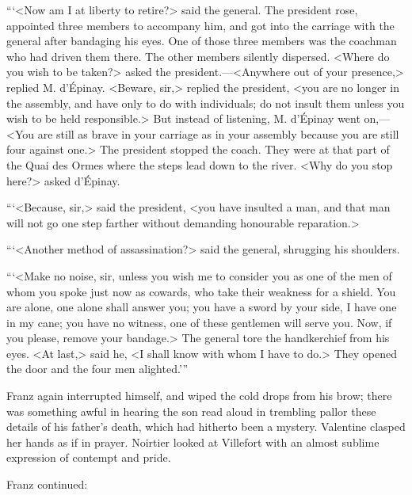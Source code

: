  “‘<Now am I at liberty to retire?> said the general. The president rose, appointed three members to accompany him, and got into the carriage with the general after bandaging his eyes. One of those three members was the coachman who had driven them there. The other members silently dispersed. <Where do you wish to be taken?> asked the president.—<Anywhere out of your presence,> replied M. d'Épinay. <Beware, sir,> replied the president, <you are no longer in the assembly, and have only to do with individuals; do not insult them unless you wish to be held responsible.> But instead of listening, M. d'Épinay went on,—<You are still as brave in your carriage as in your assembly because you are still four against one.> The president stopped the coach. They were at that part of the Quai des Ormes where the steps lead down to the river. <Why do you stop here?> asked d'Épinay. 

 “‘<Because, sir,> said the president, <you have insulted a man, and that man will not go one step farther without demanding honourable reparation.> 

 “‘<Another method of assassination?> said the general, shrugging his shoulders. 

 “‘<Make no noise, sir, unless you wish me to consider you as one of the men of whom you spoke just now as cowards, who take their weakness for a shield. You are alone, one alone shall answer you; you have a sword by your side, I have one in my cane; you have no witness, one of these gentlemen will serve you. Now, if you please, remove your bandage.> The general tore the handkerchief from his eyes. <At last,> said he, <I shall know with whom I have to do.> They opened the door and the four men alighted.'” 

 Franz again interrupted himself, and wiped the cold drops from his brow; there was something awful in hearing the son read aloud in trembling pallor these details of his father's death, which had hitherto been a mystery. Valentine clasped her hands as if in prayer. Noirtier looked at Villefort with an almost sublime expression of contempt and pride. 

 Franz continued: 

